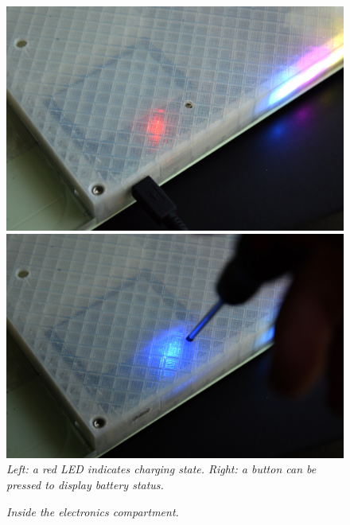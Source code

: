 \begin{figure}[h]
  \begin{minipage}[b]{.5\textwidth}
    \includegraphics[width=1\textwidth]{figures/journal-charging.jpg}
  \end{minipage}
  \begin{minipage}[b]{.5\textwidth}
    \includegraphics[width=1\textwidth]{figures/journal-battery.jpg}
  \end{minipage}
  \caption{\small {\it {Left: a red LED indicates charging state. Right: a button can be pressed to display battery status.}}} 
  \label{fig:journal-1}
\end{figure}


\begin{figure}[h]
  \caption{\small {\it {Inside the electronics compartment.}}} 
  \label{fig:internals}
\end{figure}


\clearpage